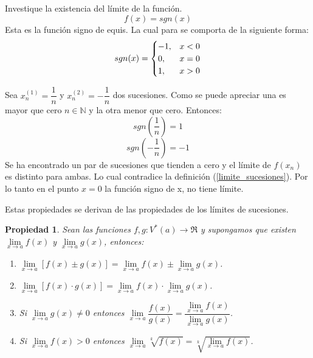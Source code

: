 \documentclass[10pt,twoside]{SelfArx} %
\begin{document}
\begin{ejemplo}\label{ejemplo_signo_suceciones}
	Investique la existencia del límite de la función.
	\[ f(x)=sgn (x) \]
	Esta es la función signo de equis. La cual para se comporta de la siguiente forma:
	\[ sgn (x)=
\begin{cases}
	-1, & \mbox{$ x<0 $}\\
	0, &	\mbox{$ x=0 $}\\
	1, &	\mbox{$ x>0 $}
	
\end{cases}
\]
	 
	 Sea $ x_{n}^{(1)}=\dfrac{1}{n} $ y $ x_{n}^{(2)}=-\dfrac{1}{n} $ dos sucesiones. Como se puede apreciar una es mayor que cero $ n\in\mathbb{N} $ y la otra menor que cero. Entonces:
	 \[ sgn\left ( \dfrac{1}{n}\right )=1 \]
	 \[ sgn\left ( -\dfrac{1}{n}\right )=-1 \]
	 Se ha encontrado un par de sucesiones que tienden a cero y el límite de $ f(x_{n}) $ es distinto para ambas. Lo cual contradice la definición (\ref{limite_sucesiones}).
	 Por lo tanto en el punto $ x=0 $ la función signo de x, no tiene límite.
	 
	
	 
\end{ejemplo}

Estas propiedades se derivan de las propiedades de los límites de sucesiones.


\newtheorem{propiedad}{Propiedad}
\begin{propiedad}
Sean las funciones $ f,g:V^{*}(a)\rightarrow\Re $ y supongamos que existen $ \lim\limits_{x\rightarrow a}f(x) $ y $ \lim\limits_{x\rightarrow a}g(x) $, entonces:\\
\begin{enumerate}
	\item[a)] 	$ \lim\limits_{x\rightarrow a}[f(x)\pm g(x)]=\lim\limits_{x\rightarrow a}f(x)\pm\lim\limits_{x\rightarrow a}g(x) $.
	
	
	\item[b)] 	$ \lim\limits_{x\rightarrow a}[f(x)\cdot g(x)]=\lim\limits_{x\rightarrow a}f(x)\cdot\lim\limits_{x\rightarrow a}g(x) $.
	
	
	\item[c)]	Si $ \lim\limits_{x\rightarrow a}g(x)\neq0 $ entonces $ \lim\limits_{x\rightarrow a}\dfrac{f(x)}{g(x)}=\dfrac{\lim\limits_{x\rightarrow a}f(x)}{\lim\limits_{x\rightarrow a}g(x)} $.
	
	
	\item[d)] 	Si $ \lim\limits_{x\rightarrow a}f(x)>0 $ entonces $ \lim\limits_{x\rightarrow a}\sqrt[k]{f(x)}=\sqrt[k]{\lim\limits_{x\rightarrow a}f(x)} $.
\end{enumerate}	
\end{propiedad}
	
\end{document}
